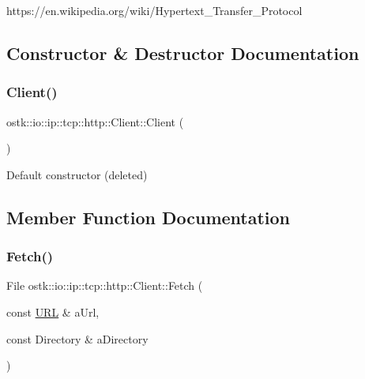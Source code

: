 https\+://en.wikipedia.\+org/wiki/\+Hypertext\+\_\+\+Transfer\+\_\+\+Protocol 

\subsection{Constructor \& Destructor Documentation}
\mbox{\label{classostk_1_1io_1_1ip_1_1tcp_1_1http_1_1_client_a2877f326d60fa80886a7b096aff767cd}} 
\subsubsection{\texorpdfstring{Client()}{Client()}}
{\footnotesize\ttfamily ostk\+::io\+::ip\+::tcp\+::http\+::\+Client\+::\+Client (\begin{DoxyParamCaption}{ }\end{DoxyParamCaption})\hspace{0.3cm}{\ttfamily [delete]}}



Default constructor (deleted) 



\subsection{Member Function Documentation}
\mbox{\label{classostk_1_1io_1_1ip_1_1tcp_1_1http_1_1_client_a58b0f28bf092cb3a6a797ae5d3779f79}} 
\subsubsection{\texorpdfstring{Fetch()}{Fetch()}}
{\footnotesize\ttfamily File ostk\+::io\+::ip\+::tcp\+::http\+::\+Client\+::\+Fetch (\begin{DoxyParamCaption}\item[{const \hyperlink{classostk_1_1io_1_1_u_r_l}{U\+RL} \&}]{a\+Url,  }\item[{const Directory \&}]{a\+Directory }\end{DoxyParamCaption})\hspace{0.3cm}{\ttfamily [static]}}



